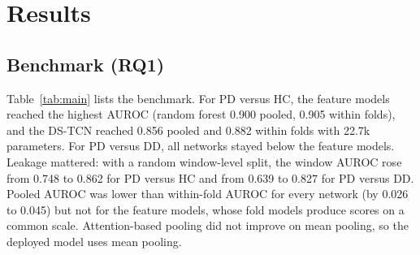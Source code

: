\documentclass[preprint,12pt]{elsarticle}
\begin{document}
\section{Results}
\label{sec:results}
\subsection{Benchmark (RQ1)}
Table~\ref{tab:main} lists the benchmark. For PD versus HC, the feature models reached the highest AUROC (random forest 0.900 pooled, 0.905 within folds), and the DS-TCN reached 0.856 pooled and 0.882 within folds with 22.7k parameters. For PD versus DD, all networks stayed below the feature models. Leakage mattered: with a random window-level split, the window AUROC rose from 0.748 to 0.862 for PD versus HC and from 0.639 to 0.827 for PD versus DD. Pooled AUROC was lower than within-fold AUROC for every network (by 0.026 to 0.045) but not for the feature models, whose fold models produce scores on a common scale. Attention-based pooling did not improve on mean pooling, so the deployed model uses mean pooling.
\end{document}
